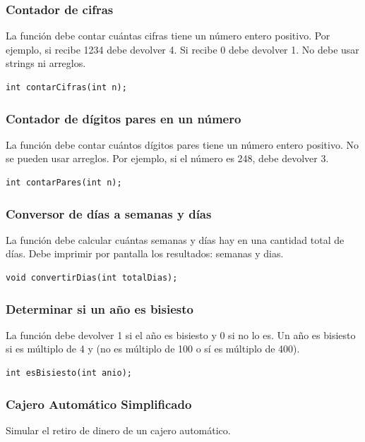 \subsubsection{Contador de cifras}
La función debe contar cuántas cifras tiene un número entero positivo. Por ejemplo, si recibe 1234 debe devolver 4. Si recibe 0 debe devolver 1. No debe usar strings ni arreglos.
\begin{lstlisting}[style=customc, basicstyle=\ttfamily]
int contarCifras(int n);
\end{lstlisting}

\subsubsection{Contador de dígitos pares en un número}
La función debe contar cuántos dígitos pares tiene un número entero positivo. No se pueden usar arreglos. Por ejemplo, si el número es 248, debe devolver 3.
\begin{lstlisting}[style=customc, basicstyle=\ttfamily]
int contarPares(int n);
\end{lstlisting}

\subsubsection{Conversor de días a semanas y días}
La función debe calcular cuántas semanas y días hay en una cantidad total de días. Debe imprimir por pantalla los resultados: semanas y dias.
\begin{lstlisting}[style=customc, basicstyle=\ttfamily]
void convertirDias(int totalDias);
\end{lstlisting}

\subsubsection{Determinar si un año es bisiesto}
La función debe devolver 1 si el año es bisiesto y 0 si no lo es. Un año es bisiesto si es múltiplo de 4 y (no es múltiplo de 100 o sí es múltiplo de 400).
\begin{lstlisting}[style=customc, basicstyle=\ttfamily]
int esBisiesto(int anio);
\end{lstlisting}


\subsubsection{Cajero Automático Simplificado}
Simular el retiro de dinero de un cajero automático.

